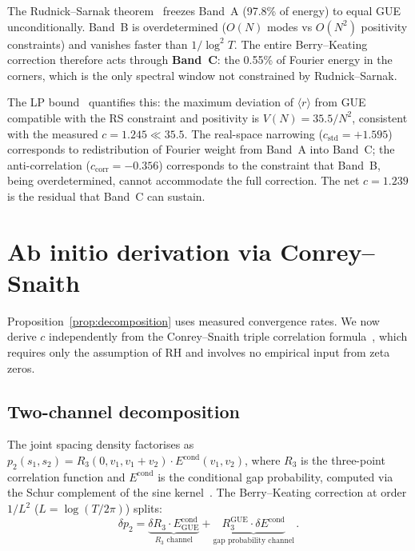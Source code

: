 \documentclass[10pt]{article}
\begin{document}
The Rudnick--Sarnak theorem~\cite{rudnick1996} freezes Band~A (97.8\% of
energy) to equal GUE unconditionally. Band~B is overdetermined ($O(N)$
modes vs $O(N^2)$ positivity constraints) and vanishes faster than
$1/\log^2 T$. The entire Berry--Keating correction therefore acts through
\textbf{Band~C}: the 0.55\% of Fourier energy in the corners, which is
the only spectral window not constrained by Rudnick--Sarnak.

The LP bound~\cite{alarcon2026e} quantifies this: the maximum deviation
of $\langle r\rangle$ from GUE compatible with the RS constraint and
positivity is $V(N) = 35.5/N^2$, consistent with the measured
$c = 1.245 \ll 35.5$. The real-space narrowing
($c_{\mathrm{std}} = +1.595$) corresponds to redistribution of
Fourier weight from Band~A into Band~C; the anti-correlation
($c_{\mathrm{corr}} = -0.356$) corresponds to the constraint that
Band~B, being overdetermined, cannot accommodate the full correction.
The net $c = 1.239$ is the residual that Band~C can sustain.


\section{Ab initio derivation via Conrey--Snaith}
\label{sec:abinitio}

Proposition~\ref{prop:decomposition} uses measured convergence rates.
We now derive $c$ independently from the Conrey--Snaith triple correlation
formula~\cite{conrey2005, conreysnaith2008}, which requires only the
assumption of RH and involves no empirical input from zeta zeros.

\subsection{Two-channel decomposition}

The joint spacing density factorises as
$p_2(s_1, s_2) = R_3(0, v_1, v_1{+}v_2) \cdot E^{\mathrm{cond}}(v_1, v_2)$,
where $R_3$ is the three-point correlation function and $E^{\mathrm{cond}}$
is the conditional gap probability, computed via the Schur complement of the
sine kernel~\cite{bornemann2010}. The Berry--Keating correction at order
$1/L^2$ ($L = \log(T/2\pi)$) splits:
\begin{equation}
\delta p_2 = \underbrace{\delta R_3 \cdot
E^{\mathrm{cond}}_{\mathrm{GUE}}}_{R_3\text{ channel}}
+ \underbrace{R_3^{\mathrm{GUE}} \cdot
\delta E^{\mathrm{cond}}}_{\text{gap probability channel}}\,.
\label{eq:two_channels}
\end{equation}
\end{document}
